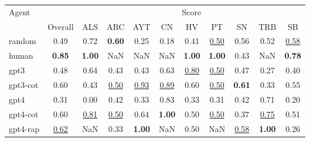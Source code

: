 \begin{tabular}{lcccccccccc}
\toprule
Agent &  & \multicolumn{9}{c}{Score} \\
\cmidrule(lr){2-11}
 &  Overall & ALS & ARC & AYT & CN & HV & PT & SN & TRB & SB \\
\midrule
random & 0.49 & 0.72 & \textbf{0.60} & 0.25 & 0.18 & 0.41 & \underline{0.50} & 0.56 & 0.52 & \underline{0.58} \\
human & \textbf{0.85} & \textbf{1.00} & NaN & NaN & NaN & \textbf{1.00} & \textbf{1.00} & 0.43 & NaN & \textbf{0.78} \\
gpt3 & 0.48 & 0.64 & 0.43 & 0.43 & 0.63 & \underline{0.80} & \underline{0.50} & 0.47 & 0.27 & 0.40 \\
gpt3-cot & 0.60 & 0.43 & \underline{0.50} & \underline{0.93} & \underline{0.89} & 0.60 & \underline{0.50} & \textbf{0.61} & 0.33 & 0.55 \\
gpt4 & 0.31 & 0.00 & 0.42 & 0.33 & 0.83 & 0.33 & 0.31 & 0.42 & 0.71 & 0.20 \\
gpt4-cot & 0.60 & \underline{0.81} & \underline{0.50} & 0.64 & \textbf{1.00} & 0.50 & \underline{0.50} & 0.37 & \underline{0.75} & 0.51 \\
gpt4-rap & \underline{0.62} & NaN & 0.33 & \textbf{1.00} & NaN & 0.50 & NaN & \underline{0.58} & \textbf{1.00} & 0.26 \\
\bottomrule
\end{tabular}
